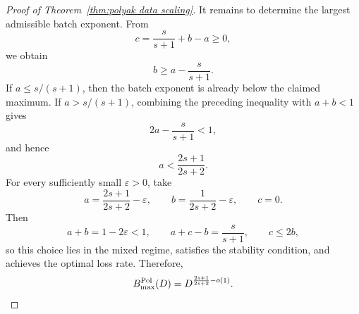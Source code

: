 \begin{proof}[Proof of Theorem~\ref{thm:polyak data scaling}]
It remains to determine the largest admissible batch exponent. From
\[
c=\frac{s}{s+1}+b-a\geq0,
\]
we obtain
\[
b\geq a-\frac{s}{s+1}.
\]
If \(a\leq s/(s+1)\), then the batch exponent is already below the claimed
maximum. If \(a>s/(s+1)\), combining the preceding inequality with
\(a+b<1\) gives
\[
2a-\frac{s}{s+1}<1,
\]
and hence
\[
a<
\frac{2s+1}{2s+2}.
\]
For every sufficiently small \(\varepsilon>0\), take
\[
a=\frac{2s+1}{2s+2}-\varepsilon,
\qquad
b=\frac{1}{2s+2}-\varepsilon,
\qquad
c=0.
\]
Then
\[
a+b=1-2\varepsilon<1,
\qquad
a+c-b=\frac{s}{s+1},
\qquad
c\leq2b,
\]
so this choice lies in the mixed regime, satisfies the stability condition,
and achieves the optimal loss rate. Therefore,
\[
B_{\max}^{\rm Pol}(D)
=
D^{\frac{2s+1}{2s+2}-o(1)}.
\]
\end{proof}




